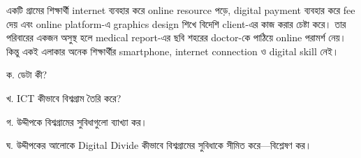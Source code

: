 \begin{topicbody}
একটি গ্রামের শিক্ষার্থী internet ব্যবহার করে online resource পড়ে, digital payment ব্যবহার করে fee দেয় এবং online platform-এ graphics design শিখে বিদেশি client-এর কাজ করার চেষ্টা করে। তার পরিবারের একজন অসুস্থ হলে medical report-এর ছবি শহরের doctor-কে পাঠিয়ে online পরামর্শ নেয়। কিন্তু একই এলাকার অনেক শিক্ষার্থীর smartphone, internet connection ও digital skill নেই।

\begin{compactenum}
\item ক. ডেটা কী?
\item খ. ICT কীভাবে বিশ্বগ্রাম তৈরি করে?
\item গ. উদ্দীপকে বিশ্বগ্রামের সুবিধাগুলো ব্যাখ্যা কর।
\item ঘ. উদ্দীপকের আলোকে Digital Divide কীভাবে বিশ্বগ্রামের সুবিধাকে সীমিত করে—বিশ্লেষণ কর।
\end{compactenum}


\end{topicbody}
